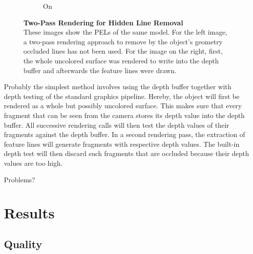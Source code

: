 \documentclass[9pt,fleqn,twoside,twocolumn]{stdglobal}
\begin{document}
\begin{figure}[h]
\begin{subfigure}[b]{0.49\linewidth}
        \caption{On}
      \end{subfigure}
      \caption{%
        \textbf{Two-Pass Rendering for Hidden Line Removal}\\
        These images show the PELs of the same model.
        For the left image, a two-pass rendering approach to remove by the object's geometry occluded lines has not been used.
        For the image on the right, first, the whole uncolored surface was rendered to write into the depth buffer and afterwards the feature lines were drawn.
      }
      \label{fig:hidden-line-removal}
    \end{figure}

    Probably the simplest method involves using the depth buffer together with depth testing of the standard graphics pipeline.
    Hereby, the object will first be rendered as a whole but possibly uncolored surface.
    This makes sure that every fragment that can be seen from the camera stores its depth value into the depth buffer.
    All successive rendering calls will then test the depth values of their fragments against the depth buffer.
    In a second rendering pass, the extraction of feature lines will generate fragments with respective depth values.
    The built-in depth test will then discard such fragments that are occluded because their depth values are too high.

    Problems?


\section{Results}
  \subsection{Quality}
\end{document}
